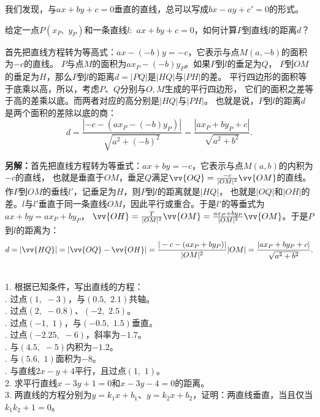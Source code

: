 \documentclass[12pt,UTF8]{ctexbook}
\begin{document}
我们发现，与$ax + by + c = 0$垂直的直线，总可以写成$bx - ay + c' = 0$的形式。

\begin{et}
    给定一点$P(x_P, \,\,y_P)$和一条直线$l: \,\, ax + by + c = 0$，如何计算$P$到直线$l$的距离$d$？
\end{et}
\begin{so}
    首先把直线方程转为等高式：$ax - (-b)y = -c$，它表示与点$M(a, -b)$的面积为$-c$的直线。
$P$与点$M$的面积为$ax_P - (-b)y_P$。如果$P$到$l$的垂足为$Q$，
$P$到$OM$的垂足为$H$，那么$P$到$l$的距离$d = |PQ|$是$|HQ|$与$|PH|$的差。
平行四边形的面积等于底乘以高，所以，考虑$P$、$Q$分别与$O, M$生成的平行四边形，
它们的面积之差等于高的差乘以底。而两者对应的高分别是$|HQ|$与$|PH|$。
也就是说，$P$到$l$的距离$d$是两个面积的差除以底的商：
$$ d = \frac{|-c - (ax_P - (-b)y_P)|}{\sqrt{a^2 + (-b)^2}} = \frac{|ax_P + by_P + c|}{\sqrt{a^2 + b^2}}.$$

\textbf{另解：}首先把直线方程转为等垂式：$ax + by = -c$，它表示与点$M(a, b)$的内积为$-c$的直线，
也就是垂直于$OM$，垂足$Q$满足$\vv{OQ} = \frac{-c}{|OM|^2}\vv{OM}$的直线。作$P$到$OM$的垂线$l'$，记垂足为$H$，则$P$到$l$的距离就是$|HQ|$，
也就是$|OQ|$和$|OH|$的差。$l$与$l'$垂直于同一条直线$OM$，因此平行或重合。于是$l'$的等垂式为$ax + by = ax_P + by_P$，
$\vv{OH} = \frac{T}{|OM|^2}\vv{OM} = \frac{ax_P + by_P}{|OM|^2}\vv{OM}$。于是$P$到$l$的距离为：
$$ d = |\vv{HQ}| = |\vv{OQ} - \vv{OH}| = \frac{|-c - (ax_P + by_P)|}{|OM|^2} |OM| = \frac{|ax_P + by_P + c|}{\sqrt{a^2 + b^2}}. $$
\end{so}

\begin{xt}
    \mbox{}\\
    1. 根据已知条件，写出直线的方程：\\
    . 过点$(1, \,\,-3)$，与$(0.5, \,\,2.1)$共轴。\\
    . 过点$(2, \,\,-0.8)$、$(-2, \,\,2.5)$。\\
    . 过点$(-1, \,\,1)$，与$(-0.5, \,\,1.5)$垂直。\\
    . 过点$(-2.25, \,\,-6)$，斜率为$-1.7$。\\
    . 与$(4.5,\,\, -5)$内积为$-1.2$。\\
    . 与$(5.6, \,\,1)$面积为$-8$。\\
    . 与直线$2x - y + 4$平行，且过点$(1, \,\, 1)$。 \\
    2. 求平行直线$x - 3y + 1 = 0$和$x - 3y - 4 = 0$的距离。 \\
    3. 两直线的方程分别为$y = k_1 x + b_1$、$y = k_2 x + b_2$，证明：两直线垂直，当且仅当$k_1k_2 + 1 = 0$。
\end{xt}
\end{document}
